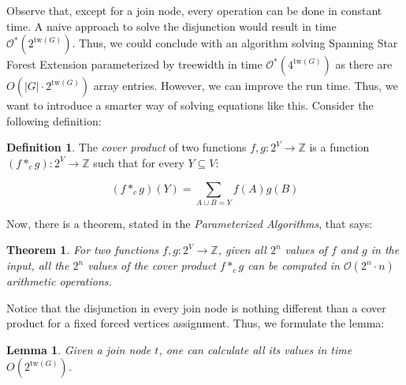 \documentclass[en]{pracamgr}
\newtheorem{theorem}{Theorem}
\newtheorem{lemma}{Lemma}
\theoremstyle{definition}
\newtheorem{definition}{Definition}
\newcommand{\ssfep}{{\sc Spanning Star Forest Extension}}
\newcommand{\tw}{\textrm{tw}}
\begin{document}
Observe that, except for a join node, every operation can be done in constant time. A naive approach to solve the disjunction would result in time $\mathcal{O}^*(2^{\tw(G)})$. Thus, we could conclude with an algorithm solving \ssfep{} parameterized by treewidth in time $\mathcal{O}^*(4^{\tw(G)})$ as there are $O(|G| \cdot 2^{\tw(G)})$ array entries. However, we can improve the run time. Thus, we want to introduce a smarter way of solving equations like this. Consider the following definition:

\begin{definition}
	The \textit{cover product} of two functions $f,g:2^V \rightarrow \mathbb{Z}$ is a function $(f *_c g):2^V \rightarrow \mathbb{Z}$ such that for every $Y \subseteq V$:
	
	\begin{equation*}
		(f *_c g)(Y) = \sum\limits_{ A \cup B = Y} f(A)g(B)
	\end{equation*}
\end{definition}

Now, there is a theorem, stated in the \textit{Parameterized Algorithms}, that says:

\begin{theorem}\label{cproduct}
	For two functions $f,g:2^V \rightarrow \mathbb{Z}$, given all $2^n$ values of $f$ and $g$ in the input, all the $2^n$ values of the cover product $f*_cg$ can be computed in $\mathcal{O}(2^n\cdot n)$ arithmetic operations.
\end{theorem}

Notice that the disjunction in every join node is nothing different than a cover product for a fixed forced vertices assignment. Thus, we formulate the lemma:

\begin{lemma}\label{join lemma}
	Given a join node $t$, one can calculate all its values in time $O(2^{\tw(G)})$.
\end{lemma}
\end{document}
